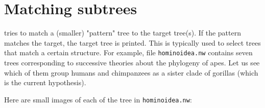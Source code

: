 \section{Matching subtrees}
\label{sct_match}

\match{} tries to match a (smaller) "pattern" tree to the target tree(s). If
the pattern matches the target, the target tree is printed. This is typically
used to select trees that match a certain structure. For example, file
\texttt{hominoidea.nw} contains seven trees corresponding to successive
theories about the phylogeny of apes. Let us see which of them group humans and
chimpanzees as a sister clade of gorillas (which is the current hypothesis).

Here are small images of each of the tree in \texttt{hominoidea.nw}: \\
\bigskip{} \\
